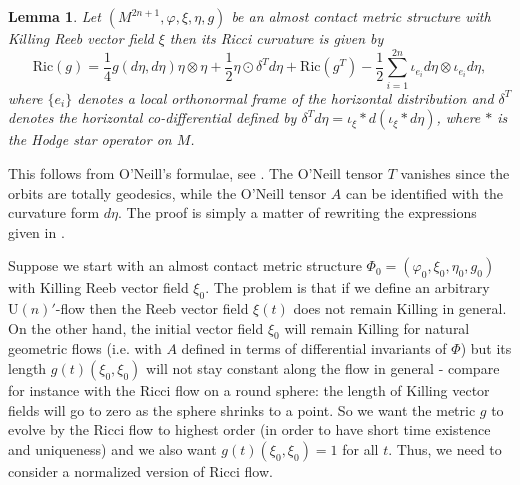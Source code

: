\documentclass{article}
\makeatletter
\renewenvironment{proof}[1][\proofname]{%
  \par\pushQED{\qed}%
  \normalfont\topsep6\p@\@plus6\p@\relax
  \trivlist
  \item[\hskip\labelsep
        \textbf{\textup{#1}}\@addpunct{.}]\ignorespaces
}{%
  \popQED\endtrivlist\@endpefalse
}
\newtheorem{lem}[thm]{Lemma}
\theoremstyle{definition}
\numberwithin{equation}{section}
\makeatother
\begin{document}
\begin{lem}\label{lemma: ricci with killing reeb}
    Let $(M^{2n+1},\varphi,\xi,\eta,g)$ be an almost contact metric structure with Killing Reeb vector field $\xi$ then its Ricci curvature is given by     \begin{equation}\label{equ: ricci s1}
        \mathrm{Ric}(g)=\frac{1}{4}g(d\eta,d\eta)\eta \otimes\eta + \frac{1}{2} \eta \odot \delta^T d\eta + \mathrm{Ric}(g^T)-\frac{1}{2} \sum_{i=1}^{2n}\iota_{e_i}d\eta \otimes\iota_{e_i}d\eta,
    \end{equation}
    where $\{e_i\}$ denotes a local orthonormal frame of the horizontal distribution and $\delta^T$ denotes the horizontal co-differential defined by $\delta^T d\eta=
    \iota_\xi  *d(\iota_\xi  * d\eta)$, where $*$ is the Hodge star operator on $M$.
\end{lem}
\begin{proof}
    This follows from O'Neill's formulae, see \cite[Proposition 9.36]{Besse}. The O'Neill tensor $T$ vanishes since the orbits are totally geodesics, while the O'Neill tensor $A$ can be identified with the curvature form $d\eta$. The proof is simply a matter of rewriting the expressions given in \cite{Besse}.
\end{proof}

Suppose we start with an almost contact metric structure $\Phi_0=(\varphi_0,\xi_0,\eta_0,g_0)$ with Killing Reeb vector field $\xi_0$. The problem is that if we define an arbitrary $\mathrm{U}(n)'$-flow then the Reeb vector field $\xi(t)$ does not remain Killing in general. On the other hand, the initial vector field $\xi_0$ will remain Killing for natural geometric flows (i.e. with $A$ defined in terms of differential invariants of $\Phi$) but its length $g(t)(\xi_0,\xi_0)$ will not stay constant along the flow in general - compare for instance with the Ricci flow on a round sphere: the length of Killing vector fields will go to zero as the sphere shrinks to a point. So we want the metric $g$ to evolve by the Ricci flow to highest order (in order to have short time existence and uniqueness) and we also want $g(t)(\xi_0,\xi_0)=1$ for all $t$. Thus, we need to consider a normalized version of Ricci flow.
\end{document}
